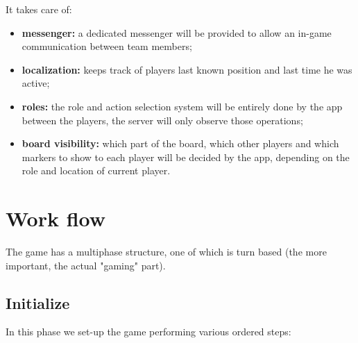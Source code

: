 				It takes care of:
				\begin{itemize}
					\item \textbf{messenger:} a dedicated messenger will be provided to allow an in-game communication between team members;
					\item \textbf{localization:} keeps track of players last known position and last time he was active;
					\item \textbf{roles:} the role and action selection system will be entirely done by the app between the players, the server will only observe those operations;
					\item \textbf{board visibility:} which part of the board, which other players and which markers to show to each player will be decided by the app, depending on the role and location of current player.
				\end{itemize}
			
	\section{Work flow}
		
		The game has a multiphase structure, one of which is turn based (the more important, the actual "gaming" part).
	
		\subsection{Initialize}
		
			In this phase we set-up the game performing various ordered steps:
			
